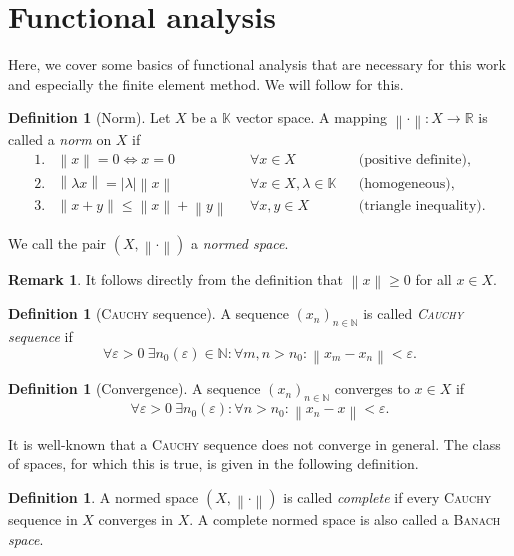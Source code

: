 \documentclass[12pt,a4paper,twoside, open=right]{scrreprt}
\theoremstyle{definition}
\newtheorem{rem}[auf]{Remark}
\newtheorem{defn}[auf]{Definition}
\theoremstyle{plain}
\newcommand{\abs}[1]{\left\vert #1\right\vert}
\newcommand{\rr}{\mathbb{R}}
\newcommand{\kk}{\mathbb{K}}
\newcommand{\nn}{\mathbb{N}}
\newcommand{\norm}[1]{\left\lVert#1\right\rVert}
\begin{document}
\section{Functional analysis}
\label{sec:funcana}
Here, we cover some basics of functional analysis that are necessary for this work and especially the finite element method. We will follow \cite{Ganesan2017} for this.
\begin{defn}[Norm]
    Let $X$ be a $\kk$ vector space. A mapping $\norm{\cdot}\colon X\to\rr$ is called a \emph{norm} on $X$ if 
    \begin{align}
        1. &\norm{x}=0 \Leftrightarrow x=0 &&\forall x\in X  &&\text{(positive definite)},\\
        2. &\norm{\lambda x}=\abs{\lambda}\norm{x} &&\forall x\in X,\lambda\in\kk &&\text{(homogeneous)},\\
        3. &\norm{x+y}\le\norm{x}+\norm{y}&&\forall x,y\in X &&\text{(triangle inequality)}.
    \end{align}

    We call the pair $(X,\norm{\cdot})$ a \emph{normed space}.
\end{defn}
\begin{rem}
    It follows directly from the definition that $\norm{x}\ge 0$ for all $ x\in X$.
\end{rem}
\begin{defn}[\textsc{Cauchy} sequence]
    A sequence $(x_n)_{n\in\nn}$ is called \emph{\textsc{Cauchy} sequence} if
    \begin{equation}
         \forall\varepsilon>0~\exists n_0(\varepsilon)\in\nn\colon \forall m,n>n_0\colon\norm{x_m-x_n}<\varepsilon.
    \end{equation}
\end{defn}
\begin{defn}[Convergence]
    A sequence $(x_n)_{n\in\nn}$ converges to $x\in X$ if 
    \begin{equation}
        \forall\varepsilon>0~\exists n_0(\varepsilon)\colon \forall n>n_0 \colon \norm{x_n -x}<\varepsilon.
    \end{equation}
\end{defn}
It is well-known that a \textsc{Cauchy} sequence does not converge in general. The class of spaces, for which this is true, is given in the following definition.
\begin{defn}
    A normed space $(X, \norm{\cdot})$ is called \emph{complete} if every \textsc{Cauchy} sequence in $X$ converges in $X$. A complete normed space is also called a \textsc{Banach} \emph{space}.
\end{defn}
\end{document}
